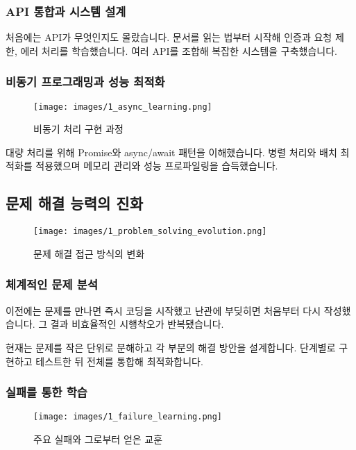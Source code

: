 \subsubsection{API 통합과 시스템 설계}

처음에는 API가 무엇인지도 몰랐습니다. 문서를 읽는 법부터 시작해 인증과 요청 제한, 에러 처리를 학습했습니다. 여러 API를 조합해 복잡한 시스템을 구축했습니다.

\subsubsection{비동기 프로그래밍과 성능 최적화}

\begin{figure}[H]
    \centering
    \texttt{[image: images/1\_async\_learning.png]}
    \caption{비동기 처리 구현 과정}
    \label{fig:async_learning}
\end{figure}

대량 처리를 위해 Promise와 async/await 패턴을 이해했습니다. 병렬 처리와 배치 최적화를 적용했으며 메모리 관리와 성능 프로파일링을 습득했습니다.

\subsection{문제 해결 능력의 진화}

\begin{figure}[H]
    \centering
    \texttt{[image: images/1\_problem\_solving\_evolution.png]}
    \caption{문제 해결 접근 방식의 변화}
    \label{fig:problem_solving_evolution}
\end{figure}

\subsubsection{체계적인 문제 분석}

이전에는 문제를 만나면 즉시 코딩을 시작했고 난관에 부딪히면 처음부터 다시 작성했습니다. 그 결과 비효율적인 시행착오가 반복됐습니다.

현재는 문제를 작은 단위로 분해하고 각 부분의 해결 방안을 설계합니다. 단계별로 구현하고 테스트한 뒤 전체를 통합해 최적화합니다.

\subsubsection{실패를 통한 학습}

\begin{figure}[H]
    \centering
    \texttt{[image: images/1\_failure\_learning.png]}
    \caption{주요 실패와 그로부터 얻은 교훈}
    \label{fig:failure_learning}
\end{figure}

